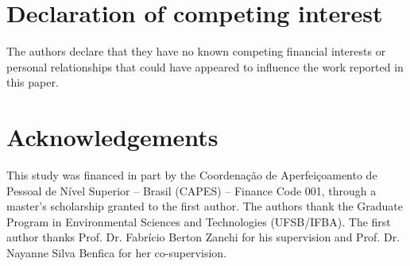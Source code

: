 \documentclass[a4paper,fleqn]{cas-dc}
\begin{document}
\section*{Declaration of competing interest}
The authors declare that they have no known competing financial interests or personal relationships that could have appeared to influence the work reported in this paper.

\section*{Acknowledgements}
This study was financed in part by the Coordenação de Aperfeiçoamento de Pessoal de Nível Superior -- Brasil (CAPES) -- Finance Code 001, through a master's scholarship granted to the first author. The authors thank the Graduate Program in Environmental Sciences and Technologies (UFSB/IFBA). The first author thanks Prof. Dr. Fabrício Berton Zanchi for his supervision and Prof. Dr. Nayanne Silva Benfica for her co-supervision.

\printcredits



\end{document}
